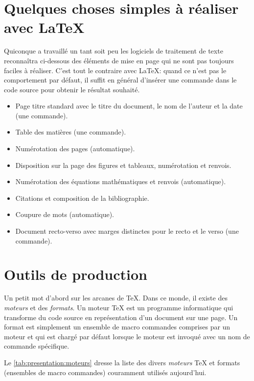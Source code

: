 \section{Quelques choses simples à réaliser avec {\LaTeX}}

Quiconque a travaillé un tant soit peu les logiciels de traitement de
texte reconnaîtra ci-dessous des éléments de mise en page qui ne sont
pas toujours faciles à réaliser. C'est tout le contraire avec
{\LaTeX}: quand ce n'est pas le comportement par défaut, il suffit en
général d'insérer une commande dans le code source pour obtenir le
résultat souhaité.

\begin{itemize}
\item Page titre standard avec le titre du document, le nom de
  l'auteur et la date (une commande).
\item Table des matières (une commande).
\item Numérotation des pages (automatique).
\item Disposition sur la page des figures et tableaux, numérotation et
  renvois.
\item Numérotation des équations mathématiques et renvois (automatique).
\item Citations et composition de la bibliographie.
\item Coupure de mots (automatique).
\item Document recto-verso avec marges distinctes pour le recto et le
  verso (une commande).
\end{itemize}


\section{Outils de production}

Un petit mot d'abord sur les arcanes de {\TeX}. Dans ce monde, il
existe des \emph{moteurs} et des \emph{formats}. Un moteur {\TeX} est
un programme informatique qui transforme du code source en
représentation d'un document sur une page. Un format est simplement un
ensemble de macro commandes comprises par un moteur et qui est chargé
par défaut lorsque le moteur est invoqué avec un nom de commande
spécifique.

Le \autoref{tab:presentation:moteurs} dresse la liste des divers
\emph{moteurs} {\TeX} et formats (ensembles de macro commandes)
couramment utilisés aujourd'hui.

